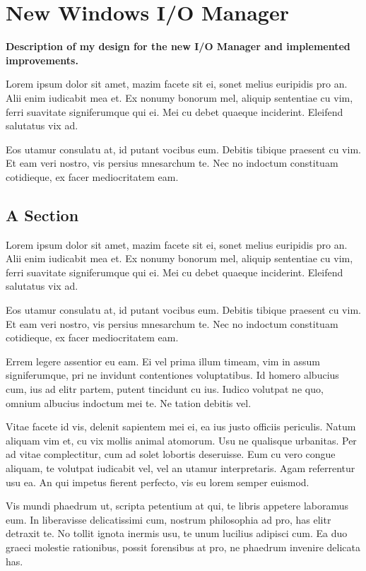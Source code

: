 \documentclass[a4paper,11pt,oneside]{report}
\begin{document}
\chapter{New Windows I/O Manager}

\textbf{Description of my design for the new I/O Manager and implemented
  improvements.}

Lorem ipsum dolor sit amet, mazim facete sit ei, sonet melius euripidis pro
an. Alii enim iudicabit mea et. Ex nonumy bonorum mel, aliquip sententiae cu
vim, ferri suavitate signiferumque qui ei. Mei cu debet quaeque
inciderint. Eleifend salutatus vix ad.

Eos utamur consulatu at, id putant vocibus eum. Debitis tibique praesent cu
vim. Et eam veri nostro, vis persius mnesarchum te. Nec no indoctum constituam
cotidieque, ex facer mediocritatem eam.


\section{A Section}

Lorem ipsum dolor sit amet, mazim facete sit ei, sonet melius euripidis pro
an. Alii enim iudicabit mea et. Ex nonumy bonorum mel, aliquip sententiae cu
vim, ferri suavitate signiferumque qui ei. Mei cu debet quaeque
inciderint. Eleifend salutatus vix ad.

Eos utamur consulatu at, id putant vocibus eum. Debitis tibique praesent cu
vim. Et eam veri nostro, vis persius mnesarchum te. Nec no indoctum constituam
cotidieque, ex facer mediocritatem eam.

Errem legere assentior eu eam. Ei vel prima illum timeam, vim in assum
signiferumque, pri ne invidunt contentiones voluptatibus. Id homero albucius
cum, ius ad elitr partem, putent tincidunt cu ius. Iudico volutpat ne quo,
omnium albucius indoctum mei te. Ne tation debitis vel.

Vitae facete id vis, delenit sapientem mei ei, ea ius justo officiis
periculis. Natum aliquam vim et, cu vix mollis animal atomorum. Usu ne qualisque
urbanitas. Per ad vitae complectitur, cum ad solet lobortis deseruisse. Eum cu
vero congue aliquam, te volutpat iudicabit vel, vel an utamur
interpretaris. Agam referrentur usu ea. An qui impetus fierent perfecto, vis eu
lorem semper euismod.

Vis mundi phaedrum ut, scripta petentium at qui, te libris appetere laboramus
eum. In liberavisse delicatissimi cum, nostrum philosophia ad pro, has elitr
detraxit te. No tollit ignota inermis usu, te unum lucilius adipisci cum. Ea duo
graeci molestie rationibus, possit forensibus at pro, ne phaedrum invenire
delicata has.
\end{document}
